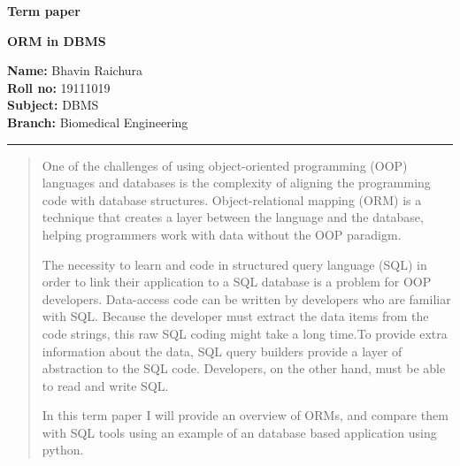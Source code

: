 \documentclass[10pt,a4paper,twoside]{article}
\begin{document}
\begin{center}
\vspace{.3cm}
{\bf {\huge Term paper}}
\item
{\bf {\huge ORM in DBMS}}
\vspace{.3cm}
\end{center}
{\bf Name:}  Bhavin Raichura\\
{\bf Roll no:}  19111019 \\
{\bf Subject:}  DBMS\\
{\bf Branch:}  Biomedical Engineering \hspace{\fill}   \\
\hrule

\vspace{.5cm}
\vspace{.4cm}

\renewcommand{\abstractname}{Abstract}

\begin{abstract}
\item One of the challenges of using object-oriented programming (OOP) languages and databases is the complexity of aligning the programming code with database structures. Object-relational mapping (ORM) is a technique that creates a layer between the language and the database, helping programmers work with data without the OOP paradigm.
\item The necessity to learn and code in structured query language (SQL) in order to link their application to a SQL database is a problem for OOP developers.
Data-access code can be written by developers who are familiar with SQL.
Because the developer must extract the data items from the code strings, this raw SQL coding might take a long time.To provide extra information about the data, SQL query builders provide a layer of abstraction to the SQL code. Developers, on the other hand, must be able to read and write SQL.
\item In this term paper I will provide an overview of ORMs, and compare them with SQL tools using an example of an database based application using python.
\end{abstract}
\end{document}
